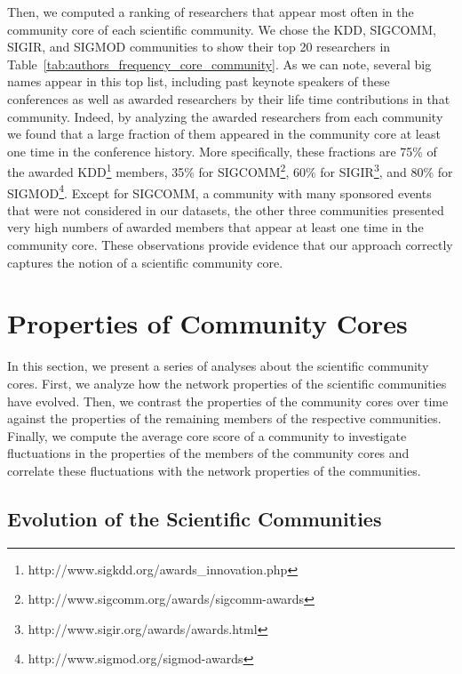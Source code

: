 \documentclass[letterpaper]{www13-companion-accepted}
\begin{document}
Then, we computed a ranking of researchers that appear most often in the community core of each scientific community. We chose the KDD, SIGCOMM, SIGIR, and SIGMOD communities to
show their top 20 researchers in Table~\ref{tab:authors_frequency_core_community}.  As we can note, several big names appear in this top list, including past keynote speakers of
these conferences as well as awarded researchers by their life time contributions in that community. Indeed, by analyzing the awarded researchers from each community we found that
a large fraction of them appeared in the community core at least one time in the conference history. More specifically, these fractions are 75\% of the awarded
KDD\footnote{http://www.sigkdd.org/awards\_innovation.php} members, 35\% for SIGCOMM\footnote{http://www.sigcomm.org/awards/sigcomm-awards}, 60\% for
SIGIR\footnote{http://www.sigir.org/awards/awards.html}, and 80\% for SIGMOD\footnote{http://www.sigmod.org/sigmod-awards}.  Except for SIGCOMM, a community with many sponsored
events that were not considered in our datasets, the other three communities presented very high numbers of awarded members that appear at least one time in the community core. These
observations provide evidence that our approach correctly captures the notion of a scientific community core.


% 

\section{Properties of Community Cores}

In this section, we present a series of analyses about the scientific community cores. First, we analyze how the network properties of the scientific communities have evolved. 
Then, we contrast the properties of the community cores over time against the properties of the remaining members of the respective communities. 
Finally, we compute the average core score of a community to investigate fluctuations in the properties of the members of the community cores and 
correlate these fluctuations with the network properties of the communities.


\subsection{Evolution of the Scientific Communities}
\label{sub:time}
\end{document}
